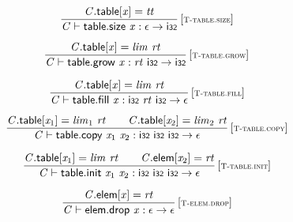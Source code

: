 $$
\begin{array}{@{}c@{}}\displaystyle
\frac{
{\mathit{C}}.\mathsf{table}{}[{\mathit{x}}] = {\mathit{tt}}
}{
{\mathit{C}} \vdash \mathsf{table.size}~{\mathit{x}} : \epsilon \rightarrow \mathsf{i{\scriptstyle32}}
} \, {[\textsc{\scriptsize T{-}table.size}]}
\qquad
\end{array}
$$

$$
\begin{array}{@{}c@{}}\displaystyle
\frac{
{\mathit{C}}.\mathsf{table}{}[{\mathit{x}}] = {\mathit{lim}}~{\mathit{rt}}
}{
{\mathit{C}} \vdash \mathsf{table.grow}~{\mathit{x}} : {\mathit{rt}}~\mathsf{i{\scriptstyle32}} \rightarrow \mathsf{i{\scriptstyle32}}
} \, {[\textsc{\scriptsize T{-}table.grow}]}
\qquad
\end{array}
$$

$$
\begin{array}{@{}c@{}}\displaystyle
\frac{
{\mathit{C}}.\mathsf{table}{}[{\mathit{x}}] = {\mathit{lim}}~{\mathit{rt}}
}{
{\mathit{C}} \vdash \mathsf{table.fill}~{\mathit{x}} : \mathsf{i{\scriptstyle32}}~{\mathit{rt}}~\mathsf{i{\scriptstyle32}} \rightarrow \epsilon
} \, {[\textsc{\scriptsize T{-}table.fill}]}
\qquad
\end{array}
$$

$$
\begin{array}{@{}c@{}}\displaystyle
\frac{
{\mathit{C}}.\mathsf{table}{}[{\mathit{x}}_{{1}}] = {\mathit{lim}}_{{1}}~{\mathit{rt}}
 \qquad
{\mathit{C}}.\mathsf{table}{}[{\mathit{x}}_{{2}}] = {\mathit{lim}}_{{2}}~{\mathit{rt}}
}{
{\mathit{C}} \vdash \mathsf{table.copy}~{\mathit{x}}_{{1}}~{\mathit{x}}_{{2}} : \mathsf{i{\scriptstyle32}}~\mathsf{i{\scriptstyle32}}~\mathsf{i{\scriptstyle32}} \rightarrow \epsilon
} \, {[\textsc{\scriptsize T{-}table.copy}]}
\qquad
\end{array}
$$

$$
\begin{array}{@{}c@{}}\displaystyle
\frac{
{\mathit{C}}.\mathsf{table}{}[{\mathit{x}}_{{1}}] = {\mathit{lim}}~{\mathit{rt}}
 \qquad
{\mathit{C}}.\mathsf{elem}{}[{\mathit{x}}_{{2}}] = {\mathit{rt}}
}{
{\mathit{C}} \vdash \mathsf{table.init}~{\mathit{x}}_{{1}}~{\mathit{x}}_{{2}} : \mathsf{i{\scriptstyle32}}~\mathsf{i{\scriptstyle32}}~\mathsf{i{\scriptstyle32}} \rightarrow \epsilon
} \, {[\textsc{\scriptsize T{-}table.init}]}
\qquad
\end{array}
$$

$$
\begin{array}{@{}c@{}}\displaystyle
\frac{
{\mathit{C}}.\mathsf{elem}{}[{\mathit{x}}] = {\mathit{rt}}
}{
{\mathit{C}} \vdash \mathsf{elem.drop}~{\mathit{x}} : \epsilon \rightarrow \epsilon
} \, {[\textsc{\scriptsize T{-}elem.drop}]}
\qquad
\end{array}
$$

